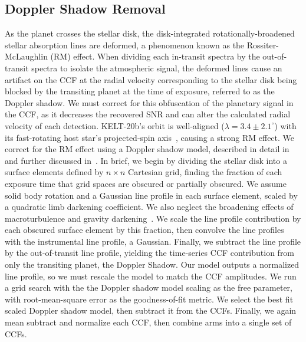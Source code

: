 \documentclass[twocolumn]{aastex631}
\begin{document}
       \subsection{Doppler Shadow Removal}
                As the planet crosses the stellar disk, the disk-integrated rotationally-broadened stellar absorption lines are deformed, a phenomenon known as the Rossiter-McLaughlin (RM) effect. When dividing each in-transit spectra by the out-of-transit spectra to isolate the atmospheric signal, the deformed lines cause an artifact on the CCF at the radial velocity corresponding to the stellar disk being blocked by the transiting planet at the time of exposure, referred to as the Doppler shadow. We must correct for this obfuscation of the planetary signal in the CCF, as it decreases the recovered SNR and can alter the calculated radial velocity of each detection. KELT-20b's orbit is well-aligned ($\lambda = 3.4 \pm 2.1 ^{\circ}$) with its fast-rotating host star's projected-spin axis~\citep{Lund2017}, causing a strong RM effect. We correct for the RM effect using a Doppler shadow model, described in detail in~\citet{Johnson2016} and further discussed in~\citep{Johnson2014, Johnson2017}. In brief, we begin by dividing the stellar disk into a surface elements defined by $n \times n$ Cartesian grid, finding the fraction of each exposure time that grid spaces are obscured or partially obscured. We assume solid body rotation and a Gaussian line profile in each surface element, scaled by a quadratic limb darkening coefficient. We also neglect the broadening effects of macroturbulence and gravity darkening~\citet{Johnson2016}. We scale the line profile contribution by each obscured surface element by this fraction, then convolve the line profiles with the instrumental line profile, a Gaussian. Finally, we subtract the line profile by the out-of-transit line profile, yielding the time-series CCF contribution from only the transiting planet, the Doppler Shadow. Our model outputs a normalized line profile, so we must rescale the model to match the CCF amplitudes. We run a grid search with the the Doppler shadow model scaling as the free parameter, with root-mean-square error as the goodness-of-fit metric. We select the best fit scaled Doppler shadow model, then subtract it from the CCFs. Finally, we again mean subtract and normalize each CCF, then combine arms into a single set of CCFs.
                
\end{document}
